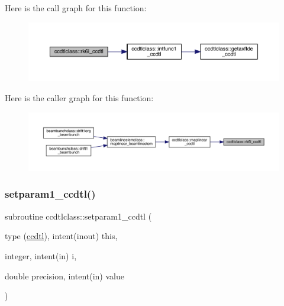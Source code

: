 Here is the call graph for this function\+:\nopagebreak
\begin{figure}[H]
\begin{center}
\leavevmode
\includegraphics[width=350pt]{namespaceccdtlclass_aca1c6ac6cdbd554820ab2c213a987647_cgraph}
\end{center}
\end{figure}
Here is the caller graph for this function\+:\nopagebreak
\begin{figure}[H]
\begin{center}
\leavevmode
\includegraphics[width=350pt]{namespaceccdtlclass_aca1c6ac6cdbd554820ab2c213a987647_icgraph}
\end{center}
\end{figure}
\mbox{\label{namespaceccdtlclass_adedaabef796136ab3b22dcc923243cfd}} 
\subsubsection{\texorpdfstring{setparam1\_ccdtl()}{setparam1\_ccdtl()}}
{\footnotesize\ttfamily subroutine ccdtlclass\+::setparam1\+\_\+ccdtl (\begin{DoxyParamCaption}\item[{type (\mbox{\hyperlink{namespaceccdtlclass_structccdtlclass_1_1ccdtl}{ccdtl}}), intent(inout)}]{this,  }\item[{integer, intent(in)}]{i,  }\item[{double precision, intent(in)}]{value }\end{DoxyParamCaption})}

\mbox{\label{namespaceccdtlclass_aa32b5665906eac3911db6712a5710f97}} 
